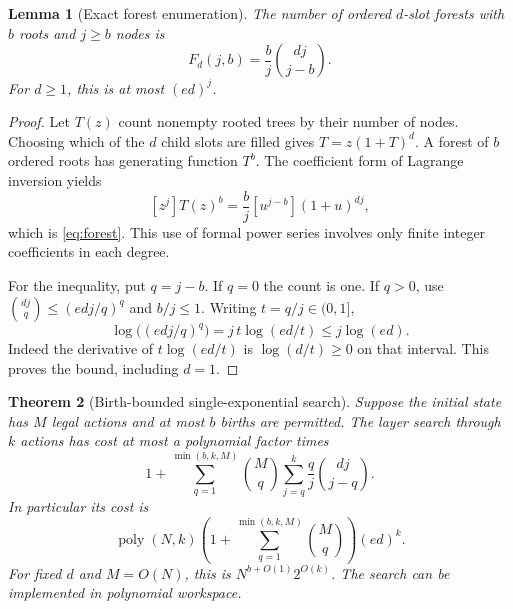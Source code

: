 \documentclass[11pt]{article}
\newtheorem{theorem}{Theorem}[section]
\newtheorem{lemma}[theorem]{Lemma}
\theoremstyle{definition}
\newcommand{\poly}{\operatorname{poly}}
\begin{document}
\begin{lemma}[Exact forest enumeration]
\label{lem:forestcount}
The number of ordered $d$-slot forests with $b$ roots and $j\ge b$ nodes is
\begin{equation}
 F_d(j,b)=\frac{b}{j}\binom{dj}{j-b}.
 \label{eq:forest}
\end{equation}
For $d\ge1$, this is at most $(ed)^j$.
\end{lemma}

\begin{proof}
Let $T(z)$ count nonempty rooted trees by their number of nodes. Choosing
which of the $d$ child slots are filled gives
$T=z(1+T)^d$. A forest of $b$ ordered roots has generating function $T^b$.
The coefficient form of Lagrange inversion yields
\[
 [z^j]T(z)^b=\frac{b}{j}[u^{j-b}](1+u)^{dj},
\]
which is \eqref{eq:forest}. This use of formal power series involves only
finite integer coefficients in each degree.

For the inequality, put $q=j-b$. If $q=0$ the count is one. If $q>0$, use
$\binom{dj}{q}\le(edj/q)^q$ and $b/j\le1$. Writing $t=q/j\in(0,1]$,
\[
 \log\big((edj/q)^q\big)=j\,t\log(ed/t)\le j\log(ed).
\]
Indeed the derivative of $t\log(ed/t)$ is $\log(d/t)\ge0$ on that
interval. This proves the bound, including $d=1$.
\end{proof}

\begin{theorem}[Birth-bounded single-exponential search]
\label{thm:rootbound}
Suppose the initial state has $M$ legal actions and at most $b$ births are
permitted. The layer search through $k$ actions has cost at most a
polynomial factor times
\begin{equation}
 1+\sum_{q=1}^{\min(b,k,M)}\binom Mq
       \sum_{j=q}^{k}\frac{q}{j}\binom{dj}{j-q}.
 \label{eq:exactbudget}
\end{equation}
In particular its cost is
\begin{equation}
 \poly(N,k)\left(1+\sum_{q=1}^{\min(b,k,M)}\binom Mq\right)(ed)^k.
 \label{eq:rootbudget}
\end{equation}
For fixed $d$ and $M=O(N)$, this is $N^{b+O(1)}2^{O(k)}$.
The search can be implemented in polynomial workspace.
\end{theorem}
\end{document}
